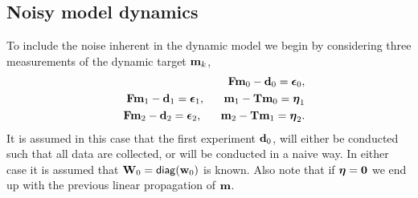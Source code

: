 \documentclass[11pt]{article}
\newcommand{\bfF}	{{\bf{F}}}
\newcommand{\bfT}	{{\bf{T}}}
\newcommand{\bfW}	{{\bf{W}}}
\newcommand{\bfd}	{{\bf{d}}}
\newcommand{\bfm}	{{\bf{m}}}
\newcommand{\bfw}	{{\bf{w}}}
\newcommand{\bfepsilon} {{\boldsymbol \epsilon}}
\newcommand{\bfeta}     {{\boldsymbol \eta}}
\newcommand {\zero}  { {\bf 0} }
\begin{document}
\subsection{Noisy model dynamics}
\label{sec:Noisy}
To include the noise inherent in the dynamic model we begin by  considering three measurements of the dynamic target $\bfm_k$,
\begin{eqnarray*}
\label{eq:noisy}
&&\bfF\bfm_{0} - \bfd_0 = \bfepsilon_0,\\
&&\bfF\bfm_{1} - \bfd_1 = \bfepsilon_1, \;\;\;\;\;\; \bfm_1 -\bfT\bfm_0 = \bfeta_1 \\
&&\bfF\bfm_{2} - \bfd_2 = \bfepsilon_2, \;\;\;\;\;\; \bfm_2 -\bfT\bfm_1 = \bfeta_2.
\end{eqnarray*} 
It is assumed in this case that the first experiment $\bfd_0$, will either be conducted such that all data are collected,  or will be conducted in a naive way. In either case it is assumed that $\bfW_0 = {\sf diag}(\bfw_0)$ is known. Also note that if $\bfeta = \zero$ we end up with the previous linear propagation of $\bfm$. 
\end{document}
